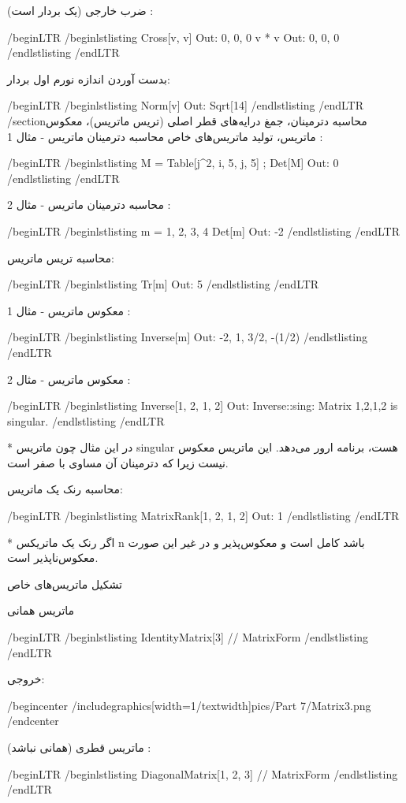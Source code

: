 ضرب خارجی (یک بردار است) :

/begin{LTR}
/begin{lstlisting}
Cross[v, v]       Out: {0, 0, 0}
v * v         Out: {0, 0, 0}
/end{lstlisting}
/end{LTR}

بدست آوردن اندازه نورم اول بردار:

/begin{LTR}
/begin{lstlisting}
Norm[v]       Out: Sqrt[14]
/end{lstlisting}
/end{LTR}
/section{محاسبه دترمینان، جمغ درایه‌های قطر اصلی (تریس ماتریس)، معکوس ماتریس، تولید ماتریس‌های خاص}
محاسبه دترمینان ماتریس - مثال 1 :

/begin{LTR}
/begin{lstlisting}
M = Table[j^2, {i, 5}, {j, 5}] ;
Det[M]    Out: 0        
/end{lstlisting}
/end{LTR}

محاسبه دترمینان ماتریس - مثال 2 :

/begin{LTR}
/begin{lstlisting}
m = {{1, 2}, {3, 4}}
Det[m]         Out: -2
/end{lstlisting}
/end{LTR}

محاسبه تریس ماتریس:

/begin{LTR}
/begin{lstlisting}
Tr[m]       Out: 5
/end{lstlisting}
/end{LTR}

معکوس ماتریس - مثال 1 :

/begin{LTR}
/begin{lstlisting}
Inverse[m]       Out: {{-2, 1}, {3/2, -(1/2)}}
/end{lstlisting}
/end{LTR}

معکوس ماتریس - مثال 2 ‌:

/begin{LTR}
/begin{lstlisting}
Inverse[{{1, 2}, {1, 2}}]      Out: Inverse::sing: Matrix {{1,2},{1,2}} is singular.
/end{lstlisting}
/end{LTR}

* در این مثال چون ماتریس singular هست، برنامه ارور می‌دهد. این ماتریس معکوس نیست زیرا که دترمینان آن مساوی با صفر است.

محاسبه رنک یک ماتریس:

/begin{LTR}
/begin{lstlisting}
MatrixRank[{{1, 2}, {1, 2}}]      Out: 1
/end{lstlisting}
/end{LTR}

* اگر رنک یک ماتریکس n باشد کامل است و معکوس‌پذیر و در غیر این صورت معکوس‌ناپذیر است.

تشکیل ماتریس‌های خاص

ماتریس همانی

/begin{LTR}
/begin{lstlisting}
IdentityMatrix[3] // MatrixForm
/end{lstlisting}
/end{LTR}

خروجی:

/begin{center}
/includegraphics[width=1/textwidth]{pics/Part 7/Matrix3.png}
/end{center}

ماتریس قطری (همانی نباشد) :

/begin{LTR}
/begin{lstlisting}
DiagonalMatrix[{1, 2, 3}] // MatrixForm
/end{lstlisting}
/end{LTR}

